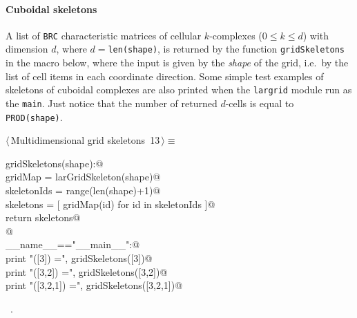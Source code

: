 \documentclass[11pt,oneside]{article}	%
\begin{document}
\paragraph{Cuboidal skeletons}
A list of \texttt{BRC} characteristic matrices of cellular $k$-complexes ($0\leq k\leq d$) with dimension $d$, where $d={}$\texttt{len(shape)}, is returned by the function \texttt{gridSkeletons} in the macro below, where the input is given by the \emph{shape} of the grid, i.e.~by the list of cell items in each coordinate direction. Some simple test examples of skeletons of cuboidal complexes are also printed when the \texttt{largrid} module run as the \texttt{main}. Just notice that the number of returned $d$-cells is equal to \texttt{PROD(shape)}.

\begin{flushleft} \small \label{scrap18}
\protect{}$\langle\,$Multidimensional grid skeletons\nobreak\ {\footnotesize 13}$\,\rangle\equiv$
\vspace{-1ex}
\begin{list}{}{} \item
\mbox{}\verb@def gridSkeletons(shape):@\\
\mbox{}\verb@   gridMap = larGridSkeleton(shape)@\\
\mbox{}\verb@   skeletonIds = range(len(shape)+1)@\\
\mbox{}\verb@   skeletons = [ gridMap(id) for id in skeletonIds ]@\\
\mbox{}\verb@   return skeletons@\\
\mbox{}\verb@   @\\
\mbox{}\verb@if __name__=="__main__":@\\
\mbox{}\verb@   print "\ngridSkeletons([3]) =\n", gridSkeletons([3])@\\
\mbox{}\verb@   print "\ngridSkeletons([3,2]) =\n", gridSkeletons([3,2])@\\
\mbox{}\verb@   print "\ngridSkeletons([3,2,1]) =\n", gridSkeletons([3,2,1])@\\
\mbox{}\verb@@{\NWsep}
\end{list}
\vspace{-1ex}
\footnotesize\addtolength{\baselineskip}{-1ex}
\begin{list}{}{\setlength{\itemsep}{-\parsep}\setlength{\itemindent}{-\leftmargin}}
\item \NWtxtMacroRefIn\ .
\end{list}
\end{flushleft}
\end{document}
